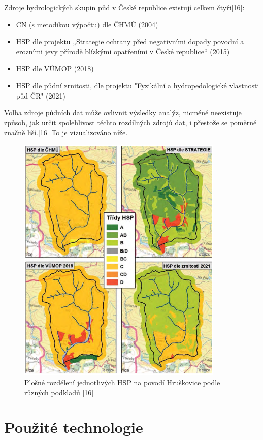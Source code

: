 \documentclass[a4paper,oneside,12pt]{book}
\begin{document}
Zdroje hydrologických skupin půd v České republice existují celkem čtyři[16]:
\begin{itemize}
\item CN (s metodikou výpočtu) dle ČHMÚ (2004)
\item HSP dle projektu „Strategie ochrany před negativními dopady povodní a erozními jevy přírodě blízkými opatřeními v České republice“ (2015)
\item HSP dle VÚMOP (2018) 
\item HSP dle půdní zrnitosti, dle projektu "Fyzikální a hydropedologické vlastnosti půd ČR" (2021)
\end{itemize}
Volba zdroje půdních dat může ovlivnit výsledky analýz, nicméně neexistuje způsob, jak určit spolehlivost těchto rozdílných zdrojů dat, i přestože se poměrně značně liší.[16] To je vizualizováno níže.

\begin{figure}[ht] \label{obr4}
\centering
\includegraphics[height=12cm]{pictures/HSPmapa.png}
\caption{Plošné rozdělení jednotlivých HSP na povodí Hruškovice podle různých podkladů [16]}
\label{fig:hsp}
\end{figure}

\newpage
\newpage

\chapter{Použité technologie} \label{tehcnologie}
\end{document}
